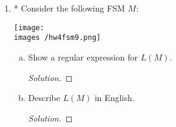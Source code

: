 \documentclass[10pt]{article}
\newcommand{\images}{/home/gparker/classes/341/images}
\begin{document}
\begin{enumerate}[1)]
\begin{enumerate}[a)]
\addtocounter{enumii}{1}
\item
$(a^+a^nb^n)$.
\begin{proof}[Answer] $ $\\
\begin{enumerate}[(i)]
\item
No
\item
NA
\item
No
\end{enumerate}
\end{proof}
\begin{proof}
Regular expressions have no meaning for superscript $n$.
\end{proof}
\addtocounter{enumii}{1}
\item
$(((ab) \cup c)^* \cap (b \cup c^*))$.
\begin{proof}[Answer] $ $\\
\begin{enumerate}[(i)]
\item
No
\item
NA
\item
Yes
\end{enumerate}
\end{proof}
\begin{proof}
The character $\cap$ is not a part of the language of regular expressions.  However, $((ab) \cup c)^*$ and $(b \cup c^*))$ are both regular expressions, and as such describe languages, so the intersection is also a language.
\end{proof}
\end{enumerate}

\pagebreak
\addtocounter{enumi}{4}

\item
* Consider the following FSM $M$:
\begin{center}
\texttt{[image: \\images /hw4fsm9.png]}
\end{center}

\begin{enumerate}[a)]
\item
Show a regular expression for $L(M)$.
\begin{proof}[Solution]
\end{proof}
\item
Describe $L(M)$ in English.
\begin{proof}[Solution]
\end{proof}
\end{enumerate}


\end{enumerate}
\end{document}
